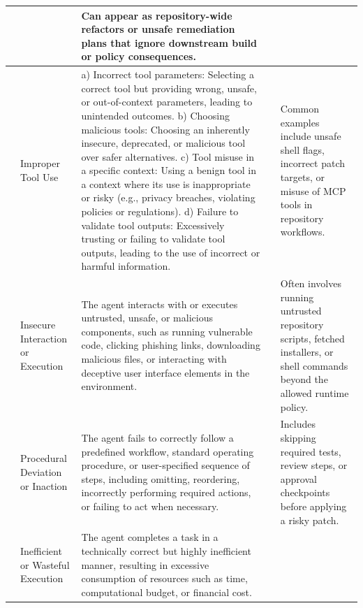 \documentclass{llmxive}
\providecommand{\codnote}[1]{#1}
\begin{document}
\begin{longtable}{|>{\arraybackslash}p{22mm}|>{\arraybackslash}p{36mm}|>{\arraybackslash}p{49mm}|>{\arraybackslash}p{22mm}|>{\arraybackslash}p{22mm}|}
&
& \codnote{Can appear as repository-wide refactors or unsafe remediation plans that ignore downstream build or policy consequences.} \\ \cline{2-5}
& Improper Tool Use
& a) Incorrect tool parameters: Selecting a correct tool but providing wrong, unsafe, or out-of-context parameters, leading to unintended outcomes.  
b) Choosing malicious tools: Choosing an inherently insecure, deprecated, or malicious tool over safer alternatives. 
c) Tool misuse in a specific context: Using a benign tool in a context where its use is inappropriate or risky (e.g., privacy breaches, violating policies or regulations).  
d) Failure to validate tool outputs: Excessively trusting or failing to validate tool outputs, leading to the use of incorrect or harmful information.

&
& \codnote{Common examples include unsafe shell flags, incorrect patch targets, or misuse of MCP tools in repository workflows.} \\ \cline{2-5}
& Insecure Interaction or Execution
& The agent interacts with or executes untrusted, unsafe, or malicious components, such as running vulnerable code, clicking phishing links, downloading malicious files, or interacting with deceptive user interface elements in the environment.

&
& \codnote{Often involves running untrusted repository scripts, fetched installers, or shell commands beyond the allowed runtime policy.} \\ \cline{2-5}
& Procedural Deviation or Inaction
& The agent fails to correctly follow a predefined workflow, standard operating procedure, or user-specified sequence of steps, including omitting, reordering, incorrectly performing required actions, or failing to act when necessary.

&
& \codnote{Includes skipping required tests, review steps, or approval checkpoints before applying a risky patch.} \\ \cline{2-5}
& Inefficient or Wasteful Execution
& The agent completes a task in a technically correct but highly inefficient manner, resulting in excessive consumption of resources such as time, computational budget, or financial cost.


\end{longtable}
\end{document}
